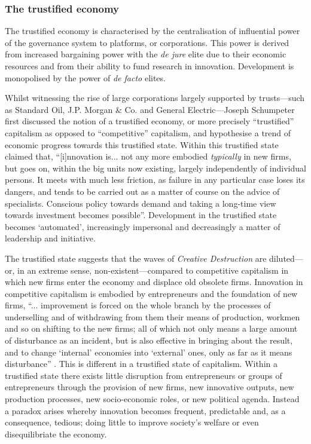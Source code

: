 \subsubsection{The trustified economy}

The trustified economy is characterised by the centralisation of influential power of the governance system to platforms, or corporations. This power is derived from increased bargaining power with the \emph{de jure} elite due to their economic resources and from their ability to fund research in innovation. Development is monopolised by the power of \emph{de facto} elites.

Whilst witnessing the rise of large corporations largely supported by trusts---such as Standard Oil, J.P. Morgan \& Co. and General Electric---Joseph Schumpeter first discussed the notion of a trustified economy, or more precisely ``trustified'' capitalism as opposed to ``competitive'' capitalism, and hypothesise a trend of economic progress towards this trustified state. Within this trustified state \citet[p.~384]{Schumpeter1928} claimed that, ``[i]nnovation is... not any more embodied \emph{typically} in new firms, but goes on, within the big units now existing, largely independently of individual persons. It meets with much less friction, as failure in any particular case loses its dangers, and tends to be carried out as a matter of course on the advice of specialists. Conscious policy towards demand and taking a long-time view towards investment becomes possible''. Development in the trustified state becomes `automated', increasingly impersonal and decreasingly a matter of leadership and initiative.

The trustified state suggests that the waves of \emph{Creative Destruction} are diluted---or, in an extreme sense, non-existent---compared to competitive capitalism in which new firms enter the economy and displace old obsolete firms. Innovation in competitive capitalism is embodied by entrepreneurs and the foundation of new firms, ``... improvement is forced on the whole branch by the processes of underselling and of withdrawing from them their means of production, workmen and so on shifting to the new firms; all of which not only means a large amount of disturbance as an incident, but is also effective in bringing about the result, and to change `internal' economies into `external' ones, only as far as it means disturbance'' \citet[p.~384]{Schumpeter1928}. This is different in a trustified state of capitalism. Within a trustified state there exists little disruption from entrepreneurs or groups of entrepreneurs through the provision of new firms, new innovative outputs, new production processes, new socio-economic roles, or new political agenda. Instead a paradox arises whereby innovation becomes frequent, predictable and, as a consequence, tedious; doing little to improve society's welfare or even disequilibriate the economy.

